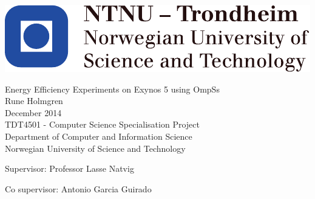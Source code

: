
\thispagestyle{empty}
\includegraphics[scale=1.1]{fig/NTNU}
\mbox{}\\[6pc]
\begin{center}
\Huge{Energy Efficiency Experiments on Exynos 5 using OmpSs}\\[2pc]

\Large{Rune Holmgren}\\[1pc]
\large{December 2014}\\[2pc]



TDT4501 - Computer Science Specialisation Project\\
Department of Computer and Information Science\\
Norwegian University of Science and Technology
\end{center}
\vfill

\noindent Supervisor: Professor Lasse Natvig

\noindent Co supervisor: Antonio Garcia Guirado

